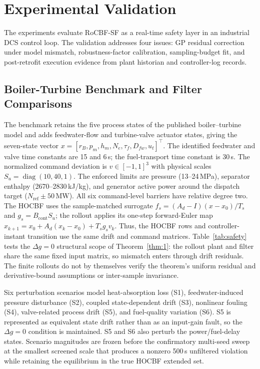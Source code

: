 \section{Experimental Validation}
\label{sec:exp}

The experiments evaluate RoCBF-SF as a real-time safety layer in an industrial DCS control loop. The validation addresses four issues: GP residual correction under model mismatch, robustness-factor calibration, sampling-budget fit, and post-retrofit execution evidence from plant historian and controller-log records.

\subsection{Boiler-Turbine Benchmark and Filter Comparisons}

The benchmark retains the five process states of the published boiler--turbine model and adds feedwater-flow and turbine-valve actuator states, giving the seven-state vector $x=[r_B,p_m,h_m,N_e,\tau_f,D_{fw},u_t]^\top$. The identified feedwater and valve time constants are 15 and 6\,s; the fuel-transport time constant is 30\,s. The normalized command deviation is $v\in[-1,1]^3$ with physical scales $S_u=\operatorname{diag}(10,40,1)$. The enforced limits are pressure (13--24\,MPa), separator enthalpy (2670--2830\,kJ/kg), and generator active power around the dispatch target ($N_{\mathrm{ref}}\pm50$\,MW). All six command-level barriers have relative degree two. The HOCBF uses the sample-matched surrogate $f_s=(A_d-I)(x-x_0)/T_s$ and $g_s=B_{\mathrm{cont}}S_u$; the rollout applies its one-step forward-Euler map $x_{k+1}=x_0+A_d(x_k-x_0)+T_sg_sv_k$. Thus, the HOCBF rows and controller-instant transition use the same drift and command matrices. Table~\ref{tab:safety} tests the $\Delta g=0$ structural scope of Theorem~\ref{thm:1}: the rollout plant and filter share the same fixed input matrix, so mismatch enters through drift residuals. The finite rollouts do not by themselves verify the theorem's uniform residual and derivative-bound assumptions or inter-sample invariance.

Six perturbation scenarios model heat-absorption loss (S1), feedwater-induced pressure disturbance (S2), coupled state-dependent drift (S3), nonlinear fouling (S4), valve-related process drift (S5), and fuel-quality variation (S6). S5 is represented as equivalent state drift rather than as an input-gain fault, so the $\Delta g=0$ condition is maintained. S5 and S6 also perturb the power/fuel-delay states. Scenario magnitudes are frozen before the confirmatory multi-seed sweep at the smallest screened scale that produces a nonzero 500\,s unfiltered violation while retaining the equilibrium in the true HOCBF extended set.

